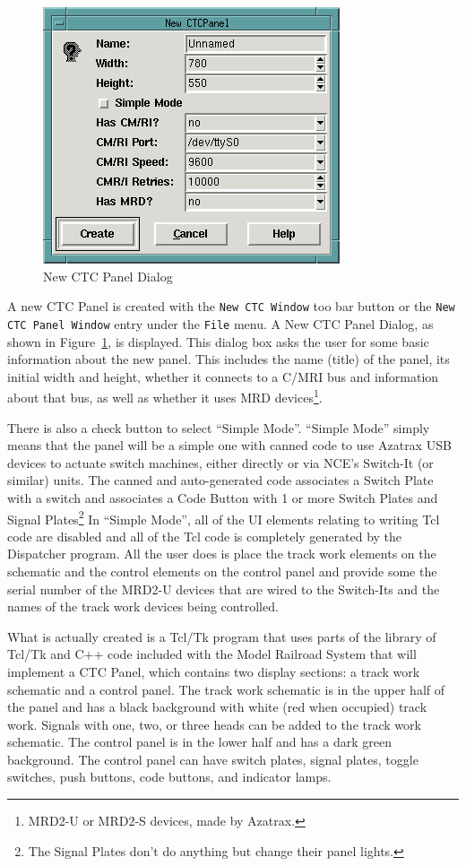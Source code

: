 \begin{figure}[hbpt] \begin{centering}
\includegraphics{DISPNewCTCPanel.png} \caption{New CTC Panel Dialog}
\label{fig:dispatcher:newCTCPanel} \end{centering} \end{figure} A new
CTC Panel is created with the \verb=New CTC Window= too bar button or
the \verb=New CTC Panel Window= entry under the \verb=File= menu.  A
New CTC Panel Dialog, as shown in
Figure~\ref{fig:dispatcher:newCTCPanel}, is displayed. This dialog box
asks the user for some basic information about the new panel.  This
includes the name (title) of the panel, its initial width and height,
whether it connects to a C/MRI bus and information about that bus, as
well as whether it uses MRD devices\footnote{MRD2-U or MRD2-S devices,
made by Azatrax.}. 

There is also a check button to select ``Simple Mode''.  ``Simple Mode''
simply means that the panel will be a simple one with canned code to
use Azatrax USB devices to actuate switch machines, either directly or
via NCE's Switch-It (or similar) units. The canned and auto-generated
code associates a Switch Plate with a switch and associates a Code
Button with 1 or more Switch Plates and Signal Plates\footnote{The
Signal Plates don't do anything but change their panel lights.}  In
``Simple Mode'', all of the UI elements relating to writing Tcl code
are disabled and all of the Tcl code is completely generated by the
Dispatcher program.  All the user does is place the track work elements
on the schematic and the control elements on the control panel and
provide some the serial number of the MRD2-U devices that are wired to
the Switch-Its and the names of the track work devices being controlled.

What is actually created is a Tcl/Tk program that uses parts of the
library of Tcl/Tk and C++ code included with the Model Railroad System
that will implement a CTC Panel, which contains two display sections: a
track work schematic and a control panel.  The track work schematic is in
the upper half of the panel and has a black background with white (red
when occupied) track work. Signals with one, two, or three heads can be
added to the track work schematic.  The control panel is in the lower
half and has a dark green background. The control panel can have switch
plates, signal plates, toggle switches, push buttons, code buttons, and
indicator lamps.

